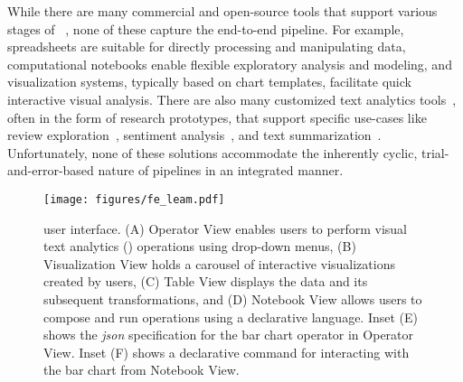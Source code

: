 While there are many commercial and open-source tools that support various stages of \vita~\cite{liu2018bridging, mlbazaar}, none of these capture the end-to-end \vita pipeline. 
For example, spreadsheets are suitable for directly processing and manipulating  data, computational notebooks enable flexible exploratory analysis and modeling, and visualization systems, typically based on chart templates, facilitate quick interactive visual analysis. There are also many customized text analytics tools~\cite{liu2018bridging}, often in the form of research prototypes, that support specific use-cases like review exploration~\cite{zhang2020teddy}, sentiment analysis~\cite{kucher2018state}, and text summarization~\cite{carenini2006interactive}.
Unfortunately, none of these solutions accommodate the inherently cyclic, trial-and-error-based nature of \vita pipelines in an integrated manner.
 
\begin{figure}[!htb] 
\vspace{-10pt}
  \centering
  \texttt{[image: figures/fe\_leam.pdf]}
  \caption{\small \system user interface. (A) Operator View enables users to perform visual text analytics (\vita) operations using drop-down menus, (B) Visualization View 
  holds a carousel of interactive visualizations created by users, (C) Table View displays the data and its subsequent transformations, and (D) Notebook View allows users to compose and run \vita operations using a declarative language. Inset (E) shows the \vta \emph{json} specification for the bar chart operator in Operator View. Inset (F) shows a declarative \vta command for interacting with the bar chart from Notebook View. \label{fig:fe}} 
 \vspace{-15pt}
\end{figure}

